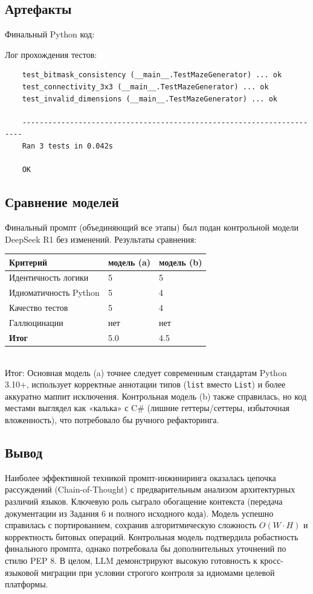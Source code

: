 \subsection{Артефакты}
Финальный Python код:

Лог прохождения тестов:
\begin{verbatim}
	test_bitmask_consistency (__main__.TestMazeGenerator) ... ok
	test_connectivity_3x3 (__main__.TestMazeGenerator) ... ok
	test_invalid_dimensions (__main__.TestMazeGenerator) ... ok
	
	----------------------------------------------------------------------
	Ran 3 tests in 0.042s
	
	OK
\end{verbatim}

\subsection{Сравнение моделей}
Финальный промпт (объединяющий все этапы) был подан контрольной модели DeepSeek R1 без изменений.
Результаты сравнения:
\begin{table}[h!]
	\centering
	\begin{tabular}{|l|p{5cm}|p{5cm}|}
		\hline
		\textbf{Критерий} & \textbf{модель (a)} & \textbf{модель (b)} \\
		\hline
		Идентичность логики & 5 & 5 \\
		\hline
		Идиоматичность Python & 5 & 4 \\
		\hline
		Качество тестов  & 5 & 4\\
		\hline
		Галлюцинации & нет & нет \\
		\hline
		\textbf{Итог} & 5.0 & 4.5\\
		\hline
	\end{tabular}
\end{table} \\
Итог: Основная модель (a) точнее следует современным стандартам Python 3.10+, использует корректные аннотации типов (\texttt{list} вместо \texttt{List}) и более аккуратно маппит исключения. Контрольная модель (b) также справилась, но код местами выглядел как «калька» с C\# (лишние геттеры/сеттеры, избыточная вложенность), что потребовало бы ручного рефакторинга.

\subsection{Вывод}
Наиболее эффективной техникой промпт-инжиниринга оказалась цепочка рассуждений (Chain-of-Thought) с предварительным анализом архитектурных различий языков. Ключевую роль сыграло обогащение контекста (передача документации из Задания 6 и полного исходного кода). Модель успешно справилась с портированием, сохранив алгоритмическую сложность $O(W \cdot H)$ и корректность битовых операций. Контрольная модель подтвердила робастность финального промпта, однако потребовала бы дополнительных уточнений по стилю PEP 8. В целом, LLM демонстрируют высокую готовность к кросс-языковой миграции при условии строгого контроля за идиомами целевой платформы.